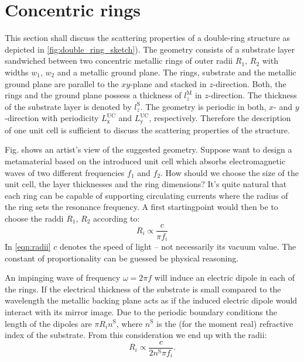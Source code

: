 \section{Concentric rings}
\label{sec:double_rings}
This section shall discuss the scattering properties of a double-ring structure as depicted in \cref{fig:double_ring_sketch}). 
The geometry consists of a substrate layer sandwiched between two concentric metallic rings of outer radii $R_{1},\,R_{2}$ with widths $w_1,\,w_2$ and a metallic ground plane. The rings, substrate and the metallic ground plane are parallel to the $xy$-plane and stacked in $z$-direction.
Both, the rings and the ground plane possess a thickness of $l_z^{\mathrm{M}}$ in $z$-direction. The thickness of the substrate layer is denoted by $l_z^{\mathrm{S}}$.
The geometry is periodic in both, $x$- and $y$-direction with periodicity $L_\mathrm{x}^\mathrm{UC}$ and $L_\mathrm{y}^\mathrm{UC}$, respectively. Therefore the description of one unit cell is sufficient to discuss the scattering properties of the structure.

Fig.  shows an artist's view of the suggested geometry. Suppose want to design a metamaterial based on the introduced unit cell which absorbs electromagnetic waves of two different frequencies $f_1$ and $f_2$. How should we choose the size of the unit cell, the layer thicknesses and the ring dimensions? 
It's quite natural that each ring can be capable of supporting circulating currents where the radius of the ring sets the resonance frequency. A first startingpoint would then be to choose the raddi $R_1$, $R_2$ according to:
\begin{equation}
R_i \propto \frac{c}{\pi f_i}
\label{eqn:radii}
\end{equation}
In \cref{eqn:radii} $c$ denotes the speed of light -- not necessarily its vacuum value. The constant of proportionality can be guessed be physical reasoning. 

An impinging wave of frequency $\omega = 2\pi f$ will induce an electric dipole in each of the rings. If the electrical thickness of the substrate is small compared to the wavelength the metallic backing plane acts as if the induced electric dipole would interact with its mirror image. Due to the periodic boundary conditions the length of the dipoles are $\pi R_i n^\mathrm{S}$, where $n^\mathrm{S}$ is the (for the moment real) refractive index of the substrate.
From this consideration we end up with the radii:
\begin{equation}
R_i \propto \frac{c}{2 n^\mathrm{S}\pi f_i}.
\label{eqn:radii_precise}
\end{equation}

